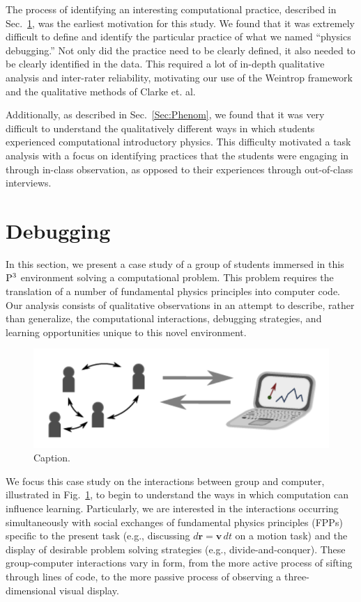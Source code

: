 \documentclass{msuphddissertation}
\begin{document}
\begin{doublespace}
The process of identifying an interesting computational practice, described in Sec.~\ref{Sec:Debug}, was the earliest motivation for this study.  We found that it was extremely difficult to define and identify the particular practice of what we named ``physics debugging.''  Not only did the practice need to be clearly defined, it also needed to be clearly identified in the data.  This required a lot of in-depth qualitative analysis and inter-rater reliability, motivating our use of the Weintrop framework and the qualitative methods of Clarke et. al.

Additionally, as described in Sec.~\ref{Sec:Phenom}, we found that it was very difficult to understand the qualitatively different ways in which students experienced computational introductory physics.  This difficulty motivated a task analysis with a focus on identifying practices that the students were engaging in through in-class observation, as opposed to their experiences through out-of-class interviews.
  
\section{Debugging}\label{Sec:Debug}

In this section, we present a case study of a group of students immersed in this ${\rm P}^{3}$ environment solving a computational problem.  This problem requires the translation of a number of fundamental physics principles into computer code.  Our analysis consists of qualitative observations in an attempt to describe, rather than generalize, the computational interactions, debugging strategies, and learning opportunities unique to this novel environment.

\begin{figure}\centering
\includegraphics[scale=1]{./images/CH4Interactions.pdf}
\caption{Caption.}\label{CH4:Interactions}
\end{figure}

We focus this case study on the interactions between group and computer, illustrated in Fig.~\ref{CH4:Interactions}, to begin to understand the ways in which computation can influence learning.  Particularly, we are interested in the interactions occurring simultaneously with social exchanges of fundamental physics principles (FPPs) specific to the present task (e.g., discussing $d\mathbf{r}=\mathbf{v}\,dt$ on a motion task) and the display of desirable problem solving strategies (e.g., divide-and-conquer).  These group-computer interactions vary in form, from the more active process of sifting through lines of code, to the more passive process of observing a three-dimensional visual display.


\end{doublespace}
\end{document}

